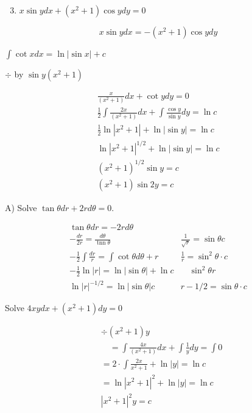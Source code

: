 \documentclass[10pt]{article}
\begin{document}
\begin{enumerate}
  \setcounter{enumi}{2}
  \item $x \sin y d x+\left(x^{2}+1\right) \cos y d y=0$
\end{enumerate}

$$
x \sin y d x=-\left(x^{2}+1\right) \cos y d y
$$

$\int \cot x d x=\ln |\sin x|+c$

$\div$ by $\sin y\left(x^{2}+1\right)$

$$
\begin{gathered}
\frac{x}{\left(x^{2}+1\right)} d x+\cot y d y=0 \\
\frac{1}{2} \int \frac{2 x}{\left(x^{2}+1\right)} d x+\int \frac{\cos y}{\sin y} d y=\ln c \\
\frac{1}{2} \ln \left|x^{2}+1\right|+\ln |\sin y|=\ln c \\
\ln \left|x^{2}+1\right|^{1 / 2}+\ln |\sin y|=\ln c \\
\left(x^{2}+1\right)^{1 / 2} \sin y=c \\
\left(x^{2}+1\right) \sin 2 y=c
\end{gathered}
$$

A) Solve $\tan \theta d r+2 r d \theta=0$.

$$
\begin{array}{rl}
\tan \theta d r=-2 r d \theta & \\
-\frac{d r}{2 r}=\frac{d \theta}{\operatorname{tnn} \theta} & \frac{1}{\sqrt{r}}=\sin \theta c \\
-\frac{1}{2} \int \frac{d r}{r}=\int \cot \theta d \theta+r & \frac{1}{r}=\sin ^{2} \theta \cdot c \\
-\frac{1}{2} \ln |r|=\ln |\sin \theta|+\ln c & \quad \sin ^{2} \theta r \\
\ln |r|^{-1 / 2}=\ln |\sin \theta| c & r-1 / 2=\sin \theta \cdot c
\end{array}
$$

Solve $4 x y d x+\left(x^{2}+1\right) d y=0$

$$
\begin{aligned}
& \div\left(x^{2}+1\right) y \\
& \quad=\int \frac{4 x}{\left(x^{2}+1\right)} d x+\int \frac{1}{y} d y=\int 0 \\
& =2 \cdot \int \frac{2 x}{x^{2}+1}+\ln |y|=\ln c \\
& =\ln \left|x^{2}+1\right|^{2}+\ln |y|=\ln c \\
& \left|x^{2}+1\right|^{2} y=c
\end{aligned}
$$
\end{document}
